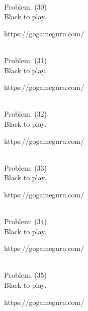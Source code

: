 \documentclass[11pt]{article}
\begin{document}
\begin{minipage}[t]{0.5\textwidth}
  {\centering
  
\\
Problem: (30)\\
Black to play.

https://gogameguru.com/\\
  }
\end{minipage}
\begin{minipage}[t]{0.5\textwidth}
  {\centering
  
\\
Problem: (31)\\
Black to play.

https://gogameguru.com/\\
  }
\end{minipage}
\begin{minipage}[t]{0.5\textwidth}
  {\centering
  
\\
Problem: (32)\\
Black to play.

https://gogameguru.com/\\
  }
\end{minipage}
\begin{minipage}[t]{0.5\textwidth}
  {\centering
  
\\
Problem: (33)\\
Black to play.

https://gogameguru.com/\\
  }
\end{minipage}
\begin{minipage}[t]{0.5\textwidth}
  {\centering
  
\\
Problem: (34)\\
Black to play.

https://gogameguru.com/\\
  }
\end{minipage}
\begin{minipage}[t]{0.5\textwidth}
  {\centering
  
\\
Problem: (35)\\
Black to play.

https://gogameguru.com/\\
  }
\end{minipage}
\end{document}
